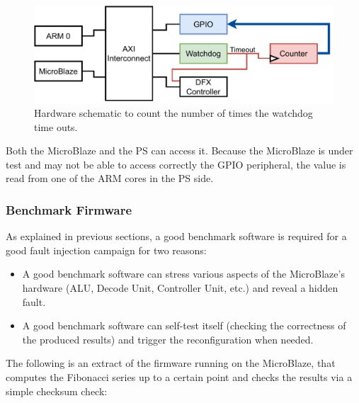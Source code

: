 \begin{figure}[H]
\centering
\includegraphics[width=0.95\linewidth]{images/chapter5/upc.pdf}
\caption{Hardware schematic to count the number of times the watchdog time outs.}
\end{figure}

Both the MicroBlaze and the PS can access it. Because the MicroBlaze is under test and may not be able to access correctly the GPIO peripheral, the value is read from one of the ARM cores in the PS side.\bigskip


\subsubsection{Benchmark Firmware}

As explained in previous sections, a good benchmark software is required for a good fault injection campaign for two reasons:
\begin{itemize}
    \item A good benchmark software can stress various aspects of the MicroBlaze's hardware (ALU, Decode Unit, Controller Unit, etc.) and reveal a hidden fault.
    \item A good benchmark software can self-test itself (checking the correctness of the produced results) and trigger the reconfiguration when needed.
\end{itemize}

The following is an extract of the firmware running on the MicroBlaze, that computes the Fibonacci series up to a certain point and checks the results via a simple checksum check:


